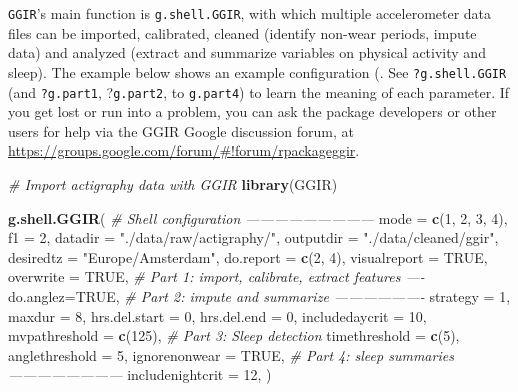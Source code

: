\documentclass[]{book}
\newenvironment{Shaded}{\begin{snugshade}}{\end{snugshade}}
\newcommand{\KeywordTok}[1]{\textcolor[rgb]{0.13,0.29,0.53}{\textbf{#1}}}
\newcommand{\DataTypeTok}[1]{\textcolor[rgb]{0.13,0.29,0.53}{#1}}
\newcommand{\DecValTok}[1]{\textcolor[rgb]{0.00,0.00,0.81}{#1}}
\newcommand{\StringTok}[1]{\textcolor[rgb]{0.31,0.60,0.02}{#1}}
\newcommand{\CommentTok}[1]{\textcolor[rgb]{0.56,0.35,0.01}{\textit{#1}}}
\newcommand{\OtherTok}[1]{\textcolor[rgb]{0.56,0.35,0.01}{#1}}
\newcommand{\NormalTok}[1]{#1}
\begin{document}
\texttt{GGIR}'s main function is \texttt{g.shell.GGIR}, with which
multiple accelerometer data files can be imported, calibrated, cleaned
(identify non-wear periods, impute data) and analyzed (extract and
summarize variables on physical activity and sleep). The example below
shows an example configuration (. See \texttt{?g.shell.GGIR} (and
\texttt{?g.part1}, ?\texttt{g.part2}, to \texttt{g.part4}) to learn the
meaning of each parameter. If you get lost or run into a problem, you
can ask the package developers or other users for help via the GGIR
Google discussion forum, at
\url{https://groups.google.com/forum/\#!forum/rpackageggir}.

\begin{Shaded}
\begin{Highlighting}[]
\CommentTok{# Import actigraphy data with GGIR}
\KeywordTok{library}\NormalTok{(GGIR)}

\KeywordTok{g.shell.GGIR}\NormalTok{(}
  \CommentTok{# Shell configuration ---------------------------}
  \DataTypeTok{mode =} \KeywordTok{c}\NormalTok{(}\DecValTok{1}\NormalTok{, }\DecValTok{2}\NormalTok{, }\DecValTok{3}\NormalTok{, }\DecValTok{4}\NormalTok{), }\DataTypeTok{f1 =} \DecValTok{2}\NormalTok{,}
  \DataTypeTok{datadir =} \StringTok{"./data/raw/actigraphy/"}\NormalTok{, }
  \DataTypeTok{outputdir =} \StringTok{"./data/cleaned/ggir"}\NormalTok{,}
  \DataTypeTok{desiredtz =} \StringTok{"Europe/Amsterdam"}\NormalTok{,}
  \DataTypeTok{do.report =} \KeywordTok{c}\NormalTok{(}\DecValTok{2}\NormalTok{, }\DecValTok{4}\NormalTok{), }\DataTypeTok{visualreport =} \OtherTok{TRUE}\NormalTok{,}
  \DataTypeTok{overwrite =} \OtherTok{TRUE}\NormalTok{,}
  \CommentTok{# Part 1: import, calibrate, extract features ----}
  \DataTypeTok{do.anglez=}\OtherTok{TRUE}\NormalTok{,}
  \CommentTok{# Part 2: impute and summarize -------------------}
  \DataTypeTok{strategy =} \DecValTok{1}\NormalTok{, }\DataTypeTok{maxdur =} \DecValTok{8}\NormalTok{,}
  \DataTypeTok{hrs.del.start =} \DecValTok{0}\NormalTok{, }\DataTypeTok{hrs.del.end =} \DecValTok{0}\NormalTok{,}
  \DataTypeTok{includedaycrit =} \DecValTok{10}\NormalTok{, }\DataTypeTok{mvpathreshold =} \KeywordTok{c}\NormalTok{(}\DecValTok{125}\NormalTok{), }
  \CommentTok{# Part 3: Sleep detection}
  \DataTypeTok{timethreshold =} \KeywordTok{c}\NormalTok{(}\DecValTok{5}\NormalTok{), }\DataTypeTok{anglethreshold =} \DecValTok{5}\NormalTok{,}
  \DataTypeTok{ignorenonwear =} \OtherTok{TRUE}\NormalTok{,}
  \CommentTok{# Part 4: sleep summaries ------------------------}
  \DataTypeTok{includenightcrit =} \DecValTok{12}\NormalTok{,}
\NormalTok{)}
\end{Highlighting}
\end{Shaded}
\end{document}
